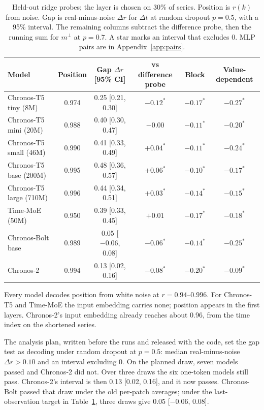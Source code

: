 \documentclass{article}
\newcommand{\mperp}{m^{\perp}}
\newcommand{\dt}{\Delta t}
\begin{document}
\begin{table}[ht]
  \caption{Held-out ridge probes; the layer is chosen on 30\% of series.
  Position is $r(k)$ from noise.
  Gap is real-minus-noise $\Delta r$ for $\dt$ at random dropout $p = 0.5$, with a 95\% interval.
  The remaining columns subtract the difference probe, then the running sum for $\mperp$ at $p = 0.7$.
  A star marks an interval that excludes 0. MLP pairs are in Appendix~\ref{app:pairs}.}
  \label{tab:main}
  \centering
  \small
  \setlength{\tabcolsep}{3.5pt}
  \begin{tabular}{lccccc}
    \toprule
    Model & Position & Gap $\Delta r$ [95\% CI] & vs difference probe & Block & Value-dependent \\
    \midrule
    Chronos-T5 tiny (8M) & 0.974 & 0.25 [0.21, 0.30] & $-0.12^{\ast}$ & $-0.17^{\ast}$ & $-0.27^{\ast}$ \\
    Chronos-T5 mini (20M) & 0.988 & 0.40 [0.30, 0.47] & $-0.00$ & $-0.11^{\ast}$ & $-0.20^{\ast}$ \\
    Chronos-T5 small (46M) & 0.990 & 0.41 [0.33, 0.49] & $+0.04^{\ast}$ & $-0.11^{\ast}$ & $-0.24^{\ast}$ \\
    Chronos-T5 base (200M) & 0.995 & 0.48 [0.36, 0.57] & $+0.06^{\ast}$ & $-0.10^{\ast}$ & $-0.17^{\ast}$ \\
    Chronos-T5 large (710M) & 0.996 & 0.44 [0.34, 0.51] & $+0.03^{\ast}$ & $-0.14^{\ast}$ & $-0.15^{\ast}$ \\
    Time-MoE (50M) & 0.950 & 0.39 [0.33, 0.45] & $+0.01$ & $-0.17^{\ast}$ & $-0.18^{\ast}$ \\
    Chronos-Bolt base & 0.989 & 0.05 [$-0.06$, 0.08] & $-0.06^{\ast}$ & $-0.14^{\ast}$ & $-0.25^{\ast}$ \\
    Chronos-2 & 0.994 & 0.13 [0.02, 0.16] & $-0.08^{\ast}$ & $-0.20^{\ast}$ & $-0.09^{\ast}$ \\
    \bottomrule
  \end{tabular}
\end{table}

Every model decodes position from white noise at $r = 0.94$--$0.996$.
For Chronos-T5 and Time-MoE the input embedding carries none; position appears in the first layers.
Chronos-2's input embedding already reaches about 0.96, from the time index on the shortened series.

The analysis plan, written before the runs and released with the code, set the gap test as decoding under random dropout at $p = 0.5$: median real-minus-noise $\Delta r > 0.10$ and an interval excluding 0.
On the planned draw, seven models passed and Chronos-2 did not.
Over three draws the six one-token models still pass.
Chronos-2's interval is then 0.13 [0.02, 0.16], and it now passes.
Chronos-Bolt passed that draw under the old per-patch averages; under the last-observation target in Table~\ref{tab:main}, three draws give 0.05 [$-0.06$, 0.08].
\end{document}
